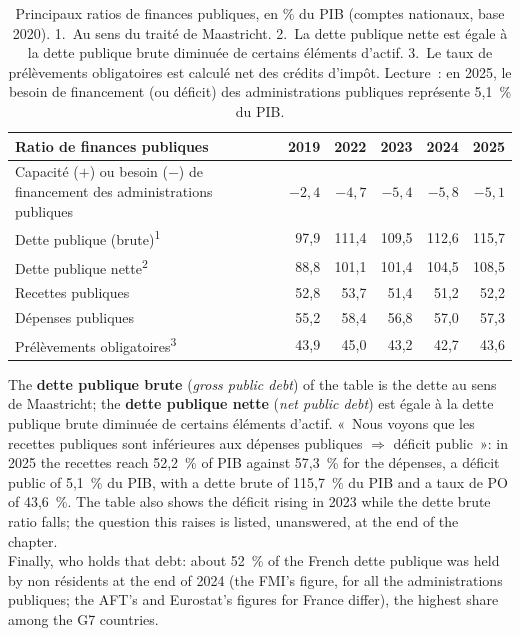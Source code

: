 \begin{table}[h!]
  \centering
  \small
  \begin{tabularx}{\textwidth}{@{}Xrrrrr@{}}
    \toprule
    Ratio de finances publiques & 2019 & 2022 & 2023 & 2024 & 2025 \\
    \midrule
    Capacité ($+$) ou besoin ($-$) de financement des administrations publiques
      & $-2{,}4$ & $-4{,}7$ & $-5{,}4$ & $-5{,}8$ & $-5{,}1$ \\
    Dette publique (brute)\textsuperscript{1}
      & 97,9 & 111,4 & 109,5 & 112,6 & 115,7 \\
    Dette publique nette\textsuperscript{2}
      & 88,8 & 101,1 & 101,4 & 104,5 & 108,5 \\
    Recettes publiques & 52,8 & 53,7 & 51,4 & 51,2 & 52,2 \\
    Dépenses publiques & 55,2 & 58,4 & 56,8 & 57,0 & 57,3 \\
    Prélèvements obligatoires\textsuperscript{3}
      & 43,9 & 45,0 & 43,2 & 42,7 & 43,6 \\
    \bottomrule
  \end{tabularx}
  \caption*{\small Principaux ratios de finances publiques, en \% du PIB
    (comptes nationaux, base 2020). 1.~Au sens du traité de Maastricht.
    2.~La dette publique nette est égale à la dette publique brute diminuée de
    certains éléments d'actif. 3.~Le taux de prélèvements obligatoires est
    calculé net des crédits d'impôt. Lecture~: en 2025, le besoin de financement
    (ou déficit) des administrations publiques représente 5,1~\% du PIB.}
\end{table}

The \textbf{dette publique brute} (\textit{gross public debt}) of the table is
the dette au sens de Maastricht; the \textbf{dette publique nette}
(\textit{net public debt}) est égale à la dette publique brute diminuée de
certains éléments d'actif. «~Nous voyons que les recettes publiques sont
inférieures aux dépenses publiques $\Rightarrow$ déficit public~»: in 2025 the
recettes reach 52,2~\% of PIB against 57,3~\% for the dépenses, a déficit public
of 5,1~\% du PIB, with a dette brute of 115,7~\% du PIB and a taux de PO of
43,6~\%. The table also shows the déficit rising in 2023 while the dette brute
ratio falls; the question this raises is listed, unanswered, at the end of the
chapter.\\

Finally, who holds that debt: about 52~\% of the French dette publique was held
by non résidents at the end of 2024 (the FMI's figure, for all the administrations
publiques; the AFT's and Eurostat's figures for France differ), the highest share
among the G7 countries.

